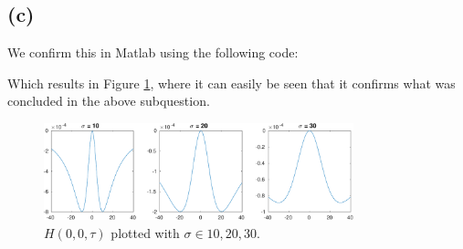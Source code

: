 \documentclass[a4paper]{article}
\begin{document}
\subsection*{(c)}
We confirm this in Matlab using the following code:

Which results in Figure \ref{2c}, where it can easily be seen that it confirms what was concluded in the above subquestion.
\begin{figure}[H]
  \centering
  \includegraphics[width=0.8\textwidth]{./2c.pdf}
  \caption{$H(0,0,\tau)$ plotted with $\sigma \in {10,20,30}$.}
  \label{2c}
\end{figure}
\end{document}
